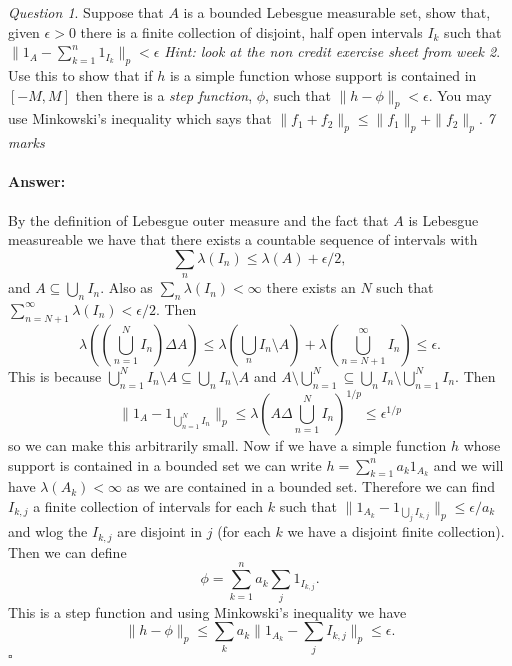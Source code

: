 \documentclass[11pt]{article}
\theoremstyle{definition}
\theoremstyle{remark}
\newtheorem{q}[thm]{Question}
\newenvironment{ans}{\paragraph{Answer:}}{\hfill$\square$ \vspace{20pt}}
\begin{document}
\begin{q}
Suppose that $A$ is a bounded Lebesgue measurable set, show that, given $\epsilon >0$ there is a finite collection of disjoint, half open intervals $I_k$ such that $\|1_A - \sum_{k=1}^n 1_{I_k}\|_p < \epsilon$ \emph{Hint: look at the non credit exercise sheet from week 2}. Use this to show that if $h$ is a simple function whose support is contained in $[-M, M]$ then there is a \emph{step function}, $\phi$, such that $\|h-\phi\|_p < \epsilon$. You may use Minkowski's inequality which says that $\|f_1+f_2\|_p \leq \|f_1\|_p + \|f_2\|_p$. \emph{7 marks}
\end{q}
\begin{ans}
By the definition of Lebesgue outer measure and the fact that $A$ is Lebesgue measureable we have that there exists a countable sequence of intervals with 
\[ \sum_n \lambda(I_n) \leq \lambda(A) + \epsilon/2, \] and $A \subseteq \bigcup_n I_n$. Also as $\sum_n \lambda(I_n) < \infty$ there exists an $N$ such that $\sum_{n = N+1}^\infty \lambda(I_n) < \epsilon/2$. Then 
\[ \lambda( \left(\bigcup_{n=1}^N I_n \right) \Delta A) \leq \lambda( \bigcup_n I_n \setminus A) + \lambda( \bigcup_{n=N+1}^\infty I_n) \leq \epsilon. \] This is because $ \bigcup_{n=1}^N I_n \setminus A \subseteq \bigcup_n I_n \setminus A$ and $A \setminus \bigcup_{n=1}^N \subseteq \bigcup_n I_n \setminus \bigcup_{n=1}^N I_n$. Then
\[ \| 1_A - 1_{\bigcup_{n=1}^N I_n} \|_p \leq \lambda(A \Delta \bigcup_{n=1}^N I_n)^{1/p} \leq \epsilon^{1/p} \] so we can make this arbitrarily small.  Now if we have a simple function $h$ whose support is contained in a bounded set we can write $h = \sum_{k=1}^n a_k 1_{A_k}$ and we will have $\lambda(A_k) < \infty$ as we are contained in a bounded set. Therefore we can find $I_{k,j}$ a finite collection of intervals for each $k$ such that $\| 1_{A_k} - 1_{ \bigcup_j I_{k,j}}\|_p \leq \epsilon/a_k$ and wlog the $I_{k,j}$ are disjoint in $j$ (for each $k$ we have a disjoint finite collection). Then we can define
\[ \phi = \sum_{k=1}^n a_k \sum_j 1_{I_{k,j}}. \] This is a step function and using Minkowski's inequality we have
\[ \| h - \phi\|_p \leq \sum_k a_k \| 1_{A_k} - \sum_j I_{k,j}\|_p \leq \epsilon. \] 
\end{ans}
\end{document}
